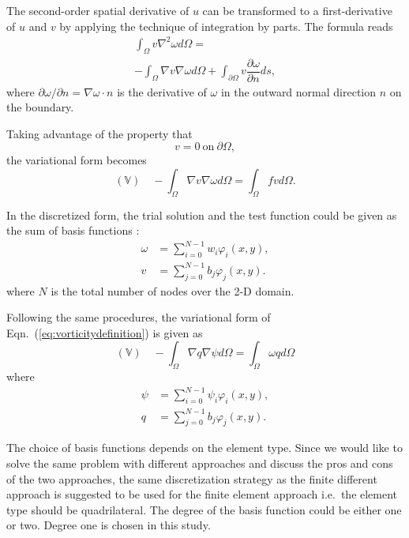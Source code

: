 \documentclass[12pt]{article}
\numberwithin{figure}{section}  %
\numberwithin{equation}{section}  %
\begin{document}
\begin{multicols}{2}
The second-order spatial derivative of $u$ can be transformed to a first-derivative of $u$ and $v$ by applying the technique of integration by parts. The formula reads
\begin{multline}
    \int_\Omega{v}\nabla^2\omega{d}\Omega = \\
    -\int_\Omega\nabla{v}\nabla\omega{d}\Omega + \int_{\partial\Omega}v\dfrac{\partial\omega}{\partial{n}}ds,
\end{multline}
where $\partial\omega/\partial{n}=\nabla\omega\cdot{n}$ is the derivative of $\omega$ in the outward normal direction $n$ on the boundary.

Taking advantage of the property that
\begin{equation}
    v = 0\ \mbox{on}\ \partial\Omega,
\end{equation}
the variational form becomes
\begin{equation}\label{eq:weakformvorticity}
    (\mathbb{V})\quad-\int_\Omega\nabla{v}\nabla\omega{d}\Omega = \int_\Omega{f}vd\Omega.
\end{equation}

In the discretized form, the trial solution and the test function could be given as the sum of basis functions \citep{gander2012euler}:
\begin{align*}
    \omega &= \sum_{i=0}^{N-1}w_i\varphi_i(x,y), \\
    v &= \sum_{j=0}^{N-1}b_j\varphi_j(x,y).
\end{align*}
where $N$ is the total number of nodes over the 2-D domain.

Following the same procedures, the variational form of Eqn.\ (\ref{eq:vorticitydefinition}) is given as
\begin{equation}\label{eq:weakformstream}
    (\mathbb{V})\quad-\int_\Omega\nabla{q}\nabla\psi{d}\Omega = \int_\Omega\omega{q}d\Omega
\end{equation}
where
\begin{align*}
    \psi &= \sum_{i=0}^{N-1}\psi_i\varphi_i(x,y), \\
    q &= \sum_{j=0}^{N-1}b_j\varphi_j(x,y).
\end{align*}

The choice of basis functions depends on the element type. Since we would like to solve the same problem with different approaches and discuss the pros and cons of the two approaches, the same discretization strategy as the finite different approach is suggested to be used for the finite element approach i.e.\ the element type should be quadrilateral. The degree of the basis function could be either one or two. Degree one is chosen in this study.


\end{multicols}
\end{document}
